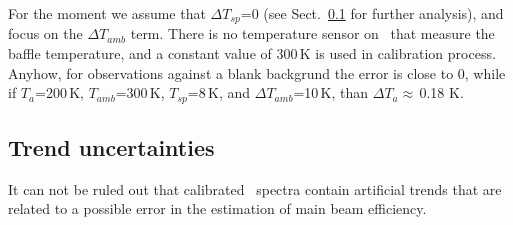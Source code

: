 \begin{itemize}

 For the moment we assume that \(\Delta T_{sp}\)=0 (see Sect.~\ref{sec:trends} for further
 analysis), and focus on the \(\Delta T_{amb}\) term.
 There is no temperature sensor on \smr\ that measure the baffle temperature, and a constant
 value of 300\,K is used in calibration process.
 Anyhow, for  observations against a blank backgrund the error
 is close to 0, while if \(T_{a}\)=200\,K, \(T_{amb}\)=300\,K, \(T_{sp}\)=8\,K,
 and \(\Delta T_{amb}\)=10\,K, than \(\Delta T_{a}\)\(\approx\)\,0.18 K.




\end{itemize}


\subsection{Trend uncertainties}
\label{sec:trends}
It can not be ruled out that calibrated \smr\ spectra
contain artificial trends that are related to a
possible error in the estimation of main beam efficiency.

